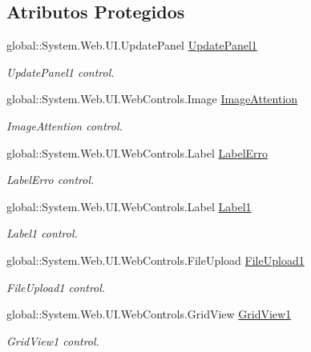 \subsection*{Atributos Protegidos}
\begin{DoxyCompactItemize}
\item 
global::System.Web.UI.UpdatePanel \hyperlink{class_sistema_r_h_1_1tab__default_a087fd2d5738e05ce1ba4f31207048641}{UpdatePanel1}
\begin{DoxyCompactList}\small\item\em UpdatePanel1 control. \item\end{DoxyCompactList}\item 
global::System.Web.UI.WebControls.Image \hyperlink{class_sistema_r_h_1_1tab__default_ab080e6d7fb0497834adccfc2544fb7ac}{ImageAttention}
\begin{DoxyCompactList}\small\item\em ImageAttention control. \item\end{DoxyCompactList}\item 
global::System.Web.UI.WebControls.Label \hyperlink{class_sistema_r_h_1_1tab__default_a63a27ef346cfd16fe3437aa19926f88c}{LabelErro}
\begin{DoxyCompactList}\small\item\em LabelErro control. \item\end{DoxyCompactList}\item 
global::System.Web.UI.WebControls.Label \hyperlink{class_sistema_r_h_1_1tab__default_a5ec7e9c30f86846ab33a8adb67e2f53d}{Label1}
\begin{DoxyCompactList}\small\item\em Label1 control. \item\end{DoxyCompactList}\item 
global::System.Web.UI.WebControls.FileUpload \hyperlink{class_sistema_r_h_1_1tab__default_a7b17d6066082461e0e2fdbf73f0866e6}{FileUpload1}
\begin{DoxyCompactList}\small\item\em FileUpload1 control. \item\end{DoxyCompactList}\item 
global::System.Web.UI.WebControls.GridView \hyperlink{class_sistema_r_h_1_1tab__default_a4418a76da62516a6d4330b0137cbf234}{GridView1}
\begin{DoxyCompactList}\small\item\em GridView1 control. \item\end{DoxyCompactList}\item 

\end{DoxyCompactItemize}
